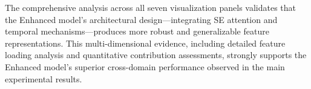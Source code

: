 \documentclass[journal]{IEEEtran}
\begin{document}

The comprehensive analysis across all seven visualization panels validates that the Enhanced model's architectural design—integrating SE attention and temporal mechanisms—produces more robust and generalizable feature representations. This multi-dimensional evidence, including detailed feature loading analysis and quantitative contribution assessments, strongly supports the Enhanced model's superior cross-domain performance observed in the main experimental results.
\end{document}
